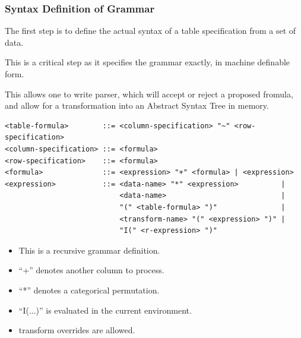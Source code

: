 \documentclass{beamer}
\begin{document}
  \begin{frame}
    \frametitle{Syntax Definition of Grammar}
   
    The first step is to define the actual syntax of a table specification
    from a set of data.

    This is a critical step as it specifies the grammar exactly, in machine
    definable form.

    This allows one to write parser, which will accept or reject a proposed fromula, and allow for a transformation into an Abstract Syntax Tree in memory.
   
  \end{frame} 

{\small
\begin{verbatim}
<table-formula>        ::= <column-specification> "~" <row-specification>
<column-specification> ::= <formula>
<row-specification>    ::= <formula>
<formula>              ::= <expression> "+" <formula> | <expression>
<expression>           ::= <data-name> "*" <expression>          | 
                           <data-name>                           |
                           "(" <table-formula> ")"               | 
                           <transform-name> "(" <expression> ")" |
                           "I(" <r-expression> ")"
\end{verbatim}
}   
\begin{itemize}
\item This is a recursive grammar definition.
\item ``+'' denotes another column to process.
\item ``*'' denotes a categorical permutation.
\item ``I(...)'' is evaluated in the current environment.
\item transform overrides are allowed.
\end{itemize}
\end{document}
